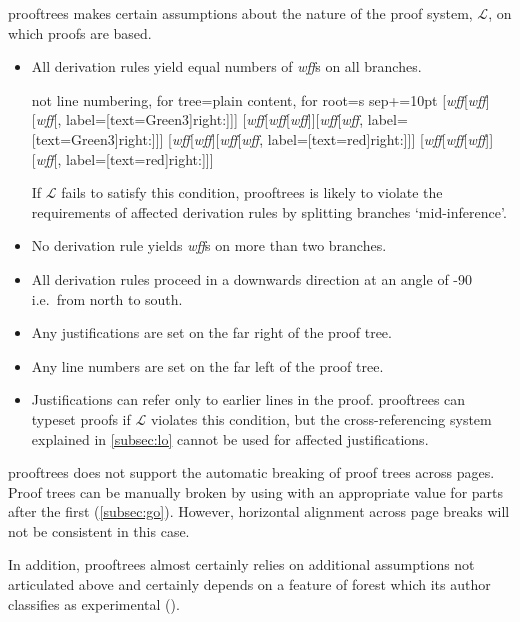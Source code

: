 \documentclass[10pt,british,a4paper,doc2]{ltxdoc}
\newcommand*{\fycheck}{\text{\ding{52}}}
\newcommand*{\fycross}{\text{\ding{56}}}
\newcommand*\pkg[1]{\textsf{#1}}
\newcommand*\wff{\emph{wff}}
\begin{document}
\pkg{prooftrees} makes certain assumptions about the nature of the proof system, $\mathcal{L}$, on which proofs are based.
\begin{itemize}
  \item All derivation rules yield equal numbers of \wff{}s on all branches.
  \begin{center}
    \begin{tableau}
      {
        not line numbering,
        for tree={plain content},
        for root={s sep+=10pt}
      }
      [\wff[\wff][\wff[\phantom{\wff}, label={[text=Green3]right:{\fycheck}}]]]
      [\wff[\wff[\wff]][\wff[\wff, label={[text=Green3]right:{\fycheck}}]]]
      [\wff[\wff][\wff[\wff, label={[text=red]right:{\fycross}}]]]
      [\wff[\wff[\wff]][\wff[\phantom{\wff}, label={[text=red]right:{\fycross}}]]]
    \end{tableau}
  \end{center}
  If $\mathcal{L}$ fails to satisfy this condition, \pkg{prooftrees} is likely to violate the requirements of affected derivation rules by splitting branches ‘mid-inference’.
  \item No derivation rule yields \wff{}s on more than two branches.
  \item All derivation rules proceed in a downwards direction at an angle of -90\textdegree{} i.e.~from north to south.
  \item Any justifications are set on the far right of the proof tree.
  \item Any line numbers are set on the far left of the proof tree.
  \item Justifications can refer only to earlier lines in the proof.
  \pkg{prooftrees} can typeset proofs if $\mathcal{L}$ violates this condition, but the cross-referencing system explained in \cref{subsec:lo} cannot be used for affected justifications.
\end{itemize}
\pkg{prooftrees} does not support the automatic breaking of proof trees across pages.
Proof trees can be manually broken by using  with an appropriate value for parts after the first (\cref{subsec:go}).
However, horizontal alignment across page breaks will not be consistent in this case.

In addition, \pkg{prooftrees} almost certainly relies on additional assumptions not articulated above and certainly depends on a feature of \pkg{forest} which its author classifies as experimental ().

\end{document}

